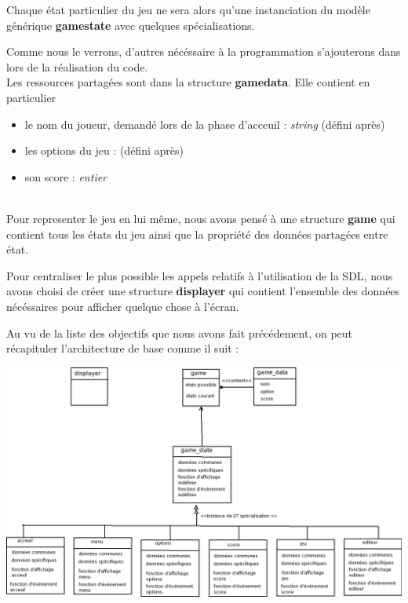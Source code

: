 Chaque état particulier du jeu ne sera alors qu'une instanciation du
modèle générique \textbf{game\textunderscore state} avec quelques spécialisations.

Comme nous le verrons, d'autres nécéssaire à la programmation s'ajouterons dans lors de la réalisation du code.
~\\

Les ressources partagées sont dans la structure
\textbf{game\textunderscore data}. Elle contient en particulier
\begin{itemize}
  \item le nom du joueur, demandé lors de la phase d'acceuil : \textit{string}
    (défini après)
  \item les options du jeu : (défini après)
  \item son score : \textit{entier}
\end{itemize}

~\\
Pour representer le jeu en lui même, nous avons pensé à une structure
\textbf{game} qui contient tous les états du jeu ainsi que la
propriété des données partagées entre état.

Pour centraliser le plus possible les appels relatifs à l'utilisation
de la SDL, nous avons choisi de créer une structure \textbf{displayer} qui
contient l'ensemble des données nécéssaires pour afficher quelque
chose à l'écran.

Au vu de la liste des objectifs que nous avons fait précédement, on
peut récapituler l'architecture de base comme il suit : 
~\\
\begin{center}
\includegraphics[scale=0.3]{img/principe.png}
\end{center}

